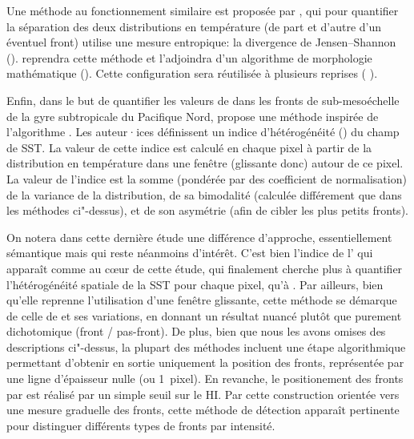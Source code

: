 Une méthode au fonctionnement similaire est proposée par \textcite{vazquez_1999}, qui pour quantifier la séparation des deux distributions en température (de part et d'autre d'un éventuel front) utilise une mesure entropique: la divergence de Jensen--Shannon (\cite{barranco-lopez_1995}).
\textcite{shimada_2005} reprendra cette méthode et l'adjoindra d'un algorithme de morphologie mathématique (\cite{jiang_1997}).
Cette configuration sera réutilisée à plusieurs reprises (\cite{lan_2012} ).

Enfin, dans le but de quantifier les valeurs de  dans les fronts de sub-mesoéchelle de la gyre subtropicale du Pacifique Nord, \textcite{liu_2016} propose une méthode inspirée de l'algorithme .
Les auteur·ices définissent un indice d'hétérogénéité () du champ de SST.
La valeur de cette indice est calculé en chaque pixel à partir de la distribution en température dans une fenêtre (glissante donc) autour de ce pixel.
La valeur de l'indice est la somme (pondérée par des coefficient de normalisation) de la variance de la distribution, de sa bimodalité (calculée différement que dans les méthodes ci"-dessus), et de son asymétrie (afin de cibler les plus petits fronts).

On notera dans cette dernière étude une différence d'approche, essentiellement sémantique mais qui reste néanmoins d'intérêt.
C'est bien l'indice de l' qui apparaît comme au cœur de cette étude, qui finalement cherche plus à quantifier l'hétérogénéité spatiale de la SST pour chaque pixel, qu'à .
Par ailleurs, bien qu'elle reprenne l'utilisation d'une fenêtre glissante, cette méthode se démarque de celle de  et ses variations, en donnant un résultat nuancé plutôt que purement dichotomique (front / pas-front).
De plus, bien que nous les avons omises des descriptions ci"-dessus, la plupart des méthodes incluent une étape algorithmique permettant d'obtenir en sortie uniquement la position des fronts, représentée par une ligne d'épaisseur nulle (ou 1~pixel).
En revanche, le positionement des fronts par \citeauthor{liu_2016} est réalisé par un simple\footnotemark{} seuil sur le HI.
Par cette construction orientée vers une mesure graduelle des fronts, cette méthode de détection apparaît pertinente pour distinguer différents types de fronts par intensité.

